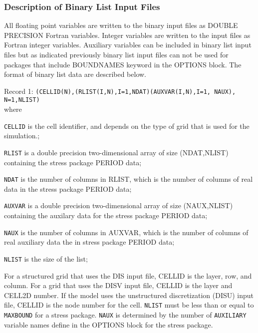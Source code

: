 \subsubsection{Description of Binary List Input Files}
All floating point variables are written to the binary input files as DOUBLE PRECISION Fortran variables. Integer variables are written to the input files as Fortran integer variables. Auxiliary variables can be included in binary list input files but as indicated previously binary list input files can not be used for packages that include BOUNDNAMES keyword in the OPTIONS block. The format of binary list data are described below.

\vspace{5mm}
\noindent Record 1: \texttt{(CELLID(N),(RLIST(I,N),I=1,NDAT)(AUXVAR(I,N),I=1, NAUX), N=1,NLIST)}\\

\noindent where

\begin{description} \itemsep0pt \parskip0pt 
\item \texttt{CELLID} is the cell identifier, and depends on the type of grid that is used for the simulation.;
\item \texttt{RLIST} is a double precision two-dimensional array of size (NDAT,NLIST) containing the stress package PERIOD data;
\item \texttt{NDAT} is the number of columns in RLIST, which is the number of columns of real data in the stress package PERIOD data;
\item \texttt{AUXVAR} is a double precision two-dimensional array of size (NAUX,NLIST)  containing the auxilary data for the stress package PERIOD data;
\item \texttt{NAUX} is the number of columns in AUXVAR, which is the number of columns of real auxiliary data the in stress package PERIOD data;
\item \texttt{NLIST} is the size of the list;
\end{description}

\noindent For a structured grid that uses the DIS input file, CELLID is the layer, row, and column. For a grid that uses the DISV input file, CELLID is the layer and CELL2D number. If the model uses the unstructured discretization (DISU) input file, CELLID is the node number for the cell. \texttt{NLIST} must be less than or equal to \texttt{MAXBOUND} for a stress package. \texttt{NAUX} is determined by the number of \texttt{AUXILIARY} variable names define in the OPTIONS block for the stress package.
